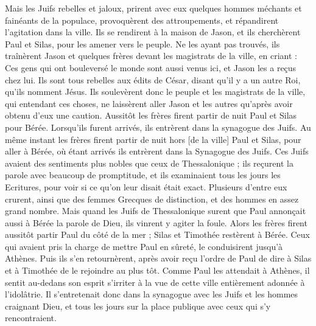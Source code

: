 \begin{multicols}{2}
Mais les Juifs rebelles et jaloux, prirent avec eux quelques hommes méchants et fainéants de la populace, provoquèrent des attroupements, et répandirent l’agitation dans la ville. Ils se rendirent à la maison de Jason, et ils cherchèrent Paul et Silas, pour les amener vers le peuple.
Ne les ayant pas trouvés, ils traînèrent Jason et quelques frères devant les magistrats de la ville, en criant : Ces gens qui ont bouleversé le monde sont aussi venus ici, et Jason les a reçus chez lui.
Ils sont tous rebelles aux édits de César, disant qu'il y a un autre Roi, qu'ils nomment Jésus.
Ils soulevèrent donc le peuple et les magistrats de la ville, qui entendant ces choses,
ne laissèrent aller Jason et les autres qu’après avoir obtenu d’eux une caution. Aussitôt les frères firent partir de nuit Paul et Silas pour Bérée. Lorsqu’ils furent arrivés, ils entrèrent dans la synagogue des Juifs.
Au même instant les frères firent partir de nuit hors [de la ville] Paul et Silas, pour aller à Bérée, où étant arrivés ils entrèrent dans la Synagogue des Juifs.
Ces Juifs avaient des sentiments plus nobles que ceux de Thessalonique ; ils reçurent la parole avec beaucoup de promptitude, et ils examinaient tous les jours les Ecritures, pour voir si ce qu’on leur disait était exact.
Plusieurs d'entre eux crurent, ainsi que des femmes Grecques de distinction, et des hommes en assez grand nombre.
Mais quand les Juifs de Thessalonique surent que Paul annonçait aussi à Bérée la parole de Dieu, ils vinrent y agiter la foule.
Alors les frères firent aussitôt partir Paul du côté de la mer ; Silas et Timothée restèrent à Bérée.
Ceux qui avaient pris la charge de mettre Paul en sûreté, le conduisirent jusqu'à Athènes. Puis ils s’en retournèrent, après avoir reçu l’ordre de Paul de dire à Silas et à Timothée de le rejoindre au plus tôt.
Comme Paul les attendait à Athènes, il sentit au-dedans son esprit s’irriter à la vue de cette ville entièrement adonnée à l'idolâtrie.
Il s’entretenait donc dans la synagogue avec les Juifs et les hommes craignant Dieu, et tous les jours sur la place publique avec ceux qui s'y rencontraient.

\end{multicols}
